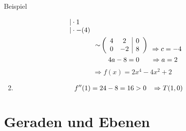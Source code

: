 \documentclass{article}
\begin{document}
\begin{boxx}[DarkBlue]{Beispiel}
\begin{enumerate}
\begin{align*}
\begin{array}{ll}
                |\cdot 1 & \\
                |\cdot -(4)&
            \end{array} \\
            \sim&\left( \begin{array}{cc|c} 4 & 2 & 0 \\ 0 & -2 & 8 \end{array} \right) \begin{array}{ll}
                & \\
                \Rightarrow c = -4&
            \end{array}\\
            &\hspace*{4mm}4a -8 = 0 \hspace*{6mm}\Rightarrow a = 2
        \end{align*}
        \[\Rightarrow f(x) = 2x^4 - 4x^2 + 2\]
        \item \begin{align*}
            f''(1) &= 24-8 = 16 > 0 \hspace*{3mm}\Rightarrow T(1, 0)
        \end{align*}
    \end{enumerate}
\end{boxx}
\newpage
\section{Geraden und Ebenen}
\end{document}
